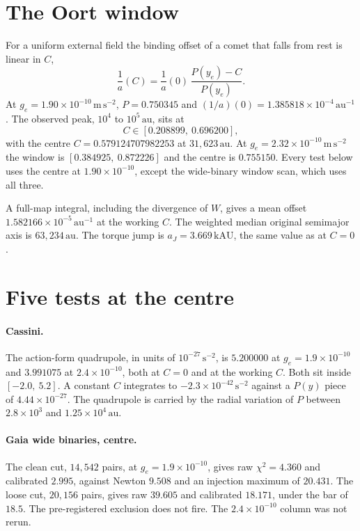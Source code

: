 \section{The Oort window}

For a uniform external field the binding offset of a comet that falls from rest is linear in \(C\),
\begin{equation}
\frac{1}{a}(C)=\frac{1}{a}(0)\,\frac{P(y_e)-C}{P(y_e)}.
\label{eq:closed}
\end{equation}
At \(g_e=1.90\times10^{-10}\,\mathrm{m\,s^{-2}}\), \(P=0.750345\) and \((1/a)(0)=1.385818\times10^{-4}\,\mathrm{au^{-1}}\). The observed peak, \(10^{4}\) to \(10^{5}\,\mathrm{au}\), sits at
\[
C\in[0.208899,\ 0.696200],
\]
with the centre \(C=0.579124707982253\) at \(31{,}623\,\mathrm{au}\). At \(g_e=2.32\times10^{-10}\,\mathrm{m\,s^{-2}}\) the window is \([0.384925,\ 0.872226]\) and the centre is \(0.755150\). Every test below uses the centre at \(1.90\times10^{-10}\), except the wide-binary window scan, which uses all three.

A full-map integral, including the divergence of \(W\), gives a mean offset \(1.582166\times10^{-5}\,\mathrm{au^{-1}}\) at the working \(C\). The weighted median original semimajor axis is \(63{,}234\,\mathrm{au}\). The torque jump is \(a_J=3.669\,\mathrm{kAU}\), the same value as at \(C=0\).

\section{Five tests at the centre}

\paragraph{Cassini.}
The action-form quadrupole, in units of \(10^{-27}\,\mathrm{s^{-2}}\), is \(5.200000\) at \(g_e=1.9\times10^{-10}\) and \(3.991075\) at \(2.4\times10^{-10}\), both at \(C=0\) and at the working \(C\). Both sit inside \([-2.0,\ 5.2]\). A constant \(C\) integrates to \(-2.3\times10^{-42}\,\mathrm{s^{-2}}\) against a \(P(y)\) piece of \(4.44\times10^{-27}\). The quadrupole is carried by the radial variation of \(P\) between \(2.8\times10^{3}\) and \(1.25\times10^{4}\,\mathrm{au}\).

\paragraph{Gaia wide binaries, centre.}
The clean cut, \(14{,}542\) pairs, at \(g_e=1.9\times10^{-10}\), gives raw \(\chi^2=4.360\) and calibrated \(2.995\), against Newton \(9.508\) and an injection maximum of \(20.431\). The loose cut, \(20{,}156\) pairs, gives raw \(39.605\) and calibrated \(18.171\), under the bar of \(18.5\). The pre-registered exclusion does not fire. The \(2.4\times10^{-10}\) column was not rerun.

